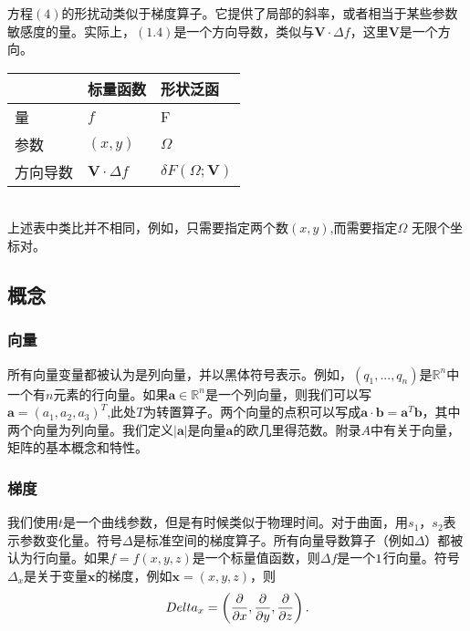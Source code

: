 \documentclass[12pt,a4paper]{article}
\numberwithin{equation}{section}
\begin{document}
方程$(4)$的形扰动类似于梯度算子。它提供了局部的斜率，或者相当于某些参数敏感度的量。实际上，$(1.4)$是一个方向导数，类似与$\mathbf{V} \cdot \Delta f$，这里$\mathbf{V}$是一个方向。
\begin{tabular}{ |l|l|l|}   
\hline   
  &  标量函数 & 形状泛函 \\
\hline
量 & $f$ & F \\
\hline
参数 & $(x,y)$ & $\Omega$ \\
\hline
方向导数 & $\mathbf{V} \cdot \Delta f$ &  $\delta F(\Omega;\mathbf{V})$ \\
\hline
\end{tabular}
\\


上述表中类比并不相同，例如，只需要指定两个数$(x,y)$,而需要指定$\Omega$	无限个坐标对。

\subsection{概念}
\subsubsection{向量}
所有向量变量都被认为是列向量，并以黑体符号表示。例如，$(q_1,...,q_n)$是$\mathbb{R}^n$中一个有$n$元素的行向量。如果$\mathbf{a}\in \mathbb{R}^n$是一个列向量，则我们可以写$\mathbf{a}=(a_1,a_2,a_3)^T$,此处$T$为转置算子。两个向量的点积可以写成$\mathbf{a} \cdot \mathbf{b}=\mathbf{a}^{T} \mathbf{b}$，其中两个向量为列向量。我们定义$|\mathbf{a}|$是向量$\mathbf{a}$的欧几里得范数。附录$A$中有关于向量，矩阵的基本概念和特性。
\subsubsection{梯度}
我们使用$t$是一个曲线参数，但是有时候类似于物理时间。对于曲面，用$s_1$，$s_2$表示参数变化量。符号$\Delta$是标准空间的梯度算子。所有向量导数算子（例如$\Delta$）都被认为行向量。如果$f=f(x,y,z)$是一个标量值函数，则$\Delta f$是一个$1\time 3$行向量。符号$\Delta _x$是关于变量$\mathbf{x}$的梯度，例如$\mathbf{x}=(x,y,z)$，则
$$
\\Delta _x=\left( \frac{\partial}{\partial x},\frac{\partial}{\partial y} ,\frac{\partial}{\partial z} \right).
$$
\end{document}
